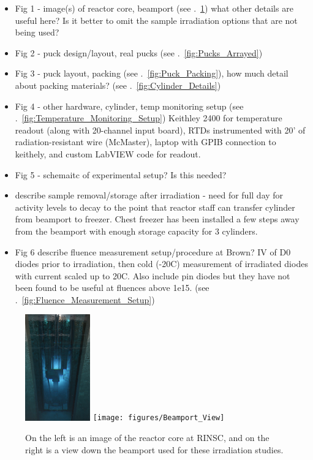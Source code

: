 \begin{itemize}
    \item Fig 1 - image(s) of reactor core, beamport (see .~\ref{fig:RINSC_Facility})
    what other details are useful here?
    Is it better to omit the sample irradiation options that are not being used?
    \item Fig 2 - puck design/layout, real pucks (see .~\ref{fig:Pucks_Arrayed})
    \item Fig 3 - puck layout, packing (see .~\ref{fig:Puck_Packing}), how much detail about packing materials? (see .~\ref{fig:Cylinder_Details})
    \item Fig 4 - other hardware, cylinder, temp monitoring setup (see .~\ref{fig:Temperature_Monitoring_Setup})
    Keithley 2400 for temperature readout (along with 20-channel input board), RTDs instrumented with 20' of radiation-resistant wire (McMaster), laptop with GPIB connection to keithely, and custom LabVIEW code for readout.
    \item Fig 5 - schemaitc of experimental setup? Is this needed?
    \item describe sample removal/storage after irradiation - need for full day for activity levels to decay to the point that reactor staff can transfer cylinder from beamport to freezer. Chest freezer has been installed a few steps away from the beamport with enough storage capacity for 3 cylinders.
    \item Fig 6 describe fluence measurement setup/procedure at Brown? IV of D0 diodes prior to irradiation, then cold (-20C) measurement of irradiated diodes with current scaled up to 20C. Also include pin diodes but they have not been found to be useful at fluences above 1e15. (see .~\ref{fig:Fluence_Measurement_Setup})
\end{itemize}

\begin{figure}[!hbt]
  \begin{center}
    \includegraphics[width=0.25\textwidth]{figures/RINSC_Reactor_Core}
    \texttt{[image: figures/Beamport\_View]}
    \caption{On the left is an image of the reactor core at RINSC, and on the right is a view down the beamport used for these irradiation studies.}
    \label{fig:RINSC_Facility}
  \end{center}
\end{figure}


